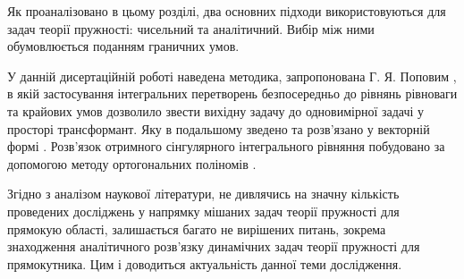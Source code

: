 Як проаналізовано в цьому розділі, два основних підходи використовуються для задач теорії пружності: чисельний та аналітичний.
Вибір між ними обумовлюється поданням граничних умов.

У данній дисертаційній роботі наведена методика, запропонована Г. Я. Поповим \cite{popov_4},
в якій застосування інтегральних перетворень безпосередньо до рівнянь рівноваги та крайових умов
дозволило звести вихідну задачу до одновимірної задачі у просторі трансформант.
Яку в подальшому зведено та розв'язано у векторній формі \cite{popov_5}.
Розв'язок отримного сінгулярного інтегрального рівняння побудовано за допомогою методу ортогональних поліномів \cite{popov_3}.

Згідно з аналізом наукової літератури,
не дивлячись на значну кількість проведених досліджень у напрямку мішаних задач теорії пружності для прямокую області,
залишається багато не вирішених питань, зокрема знаходження аналітичного розв'язку динамічних задач теорії пружності для прямокутника.
Цим і доводиться актуальність данної теми дослідження.